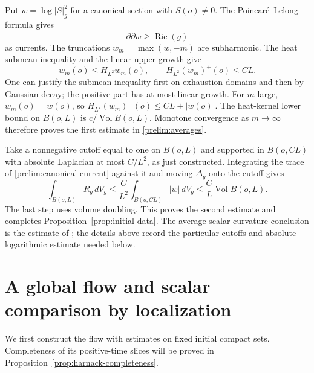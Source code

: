 \documentclass[11pt]{article}
\theoremstyle{definition}
\theoremstyle{remark}
\newcommand{\dd}{\partial\bar\partial}
\DeclareMathOperator{\Ric}{Ric}
\DeclareMathOperator{\Vol}{Vol}
\numberwithin{equation}{section}
\begin{document}
Put $w=\log|S|_g^2$ for a canonical section with $S(o)\ne0$.
The Poincar\'e--Lelong formula gives
\begin{equation}\label{prelim:canonical-current}
 \dd w\ge\Ric(g)
\end{equation}
as currents.  The truncations $w_m=\max(w,-m)$ are subharmonic.
The heat submean inequality and the linear upper growth give
\[
 w_m(o)\le H_{L^2}w_m(o),\qquad
 H_{L^2}(w_m)^+(o)\le CL.
\]
One can justify the submean inequality first on exhaustion domains
and then by Gaussian decay; the positive part has at most linear
growth.  For $m$ large, $w_m(o)=w(o)$, so
$H_{L^2}(w_m)^-(o)\le CL+|w(o)|$.  The heat-kernel lower bound on
$B(o,L)$ is $c/\Vol B(o,L)$.  Monotone convergence as $m\to\infty$
therefore proves the first estimate in \eqref{prelim:averages}.

Take a nonnegative cutoff equal to one on $B(o,L)$ and supported in
$B(o,CL)$ with absolute Laplacian at most $C/L^2$, as just constructed.
Integrating the trace of \eqref{prelim:canonical-current} against it
and moving $\Delta_g$ onto the cutoff gives
\[
 \int_{B(o,L)}R_g\,dV_g
 \le \frac{C}{L^2}\int_{B(o,CL)}|w|\,dV_g
 \le \frac{C}{L}\Vol B(o,L).
\]
The last step uses volume doubling.  This proves the second estimate
and completes Proposition~\ref{prop:initial-data}.  The average
scalar-curvature conclusion is the estimate of
\cite[Theorem~2]{ChenZhu}; the details above record the particular
cutoffs and absolute logarithmic estimate needed below.

\section{A global flow and scalar comparison by localization}
\label{sec:flow}

We first construct the flow with estimates on fixed initial compact
sets.  Completeness of its positive-time slices will be proved in
Proposition~\ref{prop:harnack-completeness}.
\end{document}
